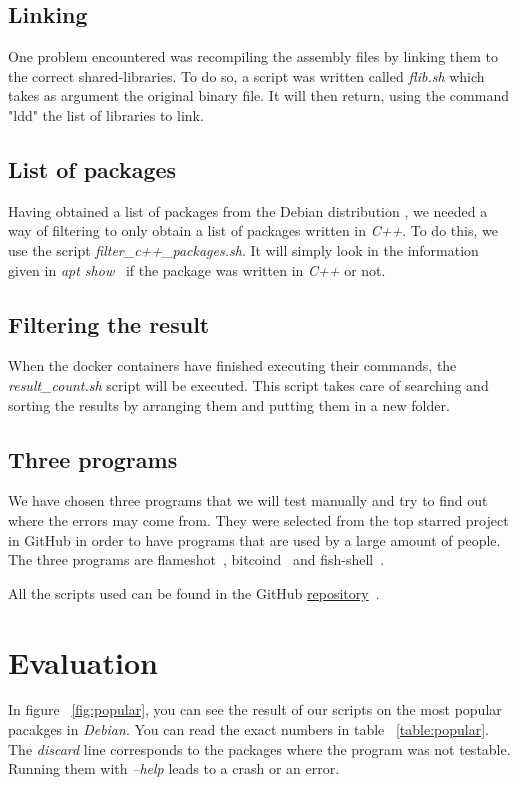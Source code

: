 \documentclass[a4paper,11pt,oneside]{report}
\begin{document}
\section{Linking}
One problem encountered was recompiling the
assembly files by linking them to the correct shared-libraries. To do so, a 
script was written called  \textit{flib.sh} which takes as argument the original binary
file. It will then return, using the command "ldd"\cite{ldd} the list of
libraries to link. 

\section{List of packages}

Having obtained a list of packages from the Debian distribution
\cite{sourcePackage}, we needed a way of filtering to only obtain
a list of packages written in \textit{C++}. To do this, we use the script
\textit{filter\_c++\_packages.sh}. It will simply look in the information given
in \textit{apt show}~\cite{apt} if the package was written in \textit{C++} or
not. 

\section{Filtering the result}
When the docker containers have finished executing their commands, the
\textit{result\_count.sh} script will be executed. This script takes care of searching
and sorting the results by arranging them and putting them in a new folder.

\section{Three programs}
We have chosen three programs that we will test manually and try to find out
where the errors may come from. They were selected from the top starred project
in GitHub in order to have programs that are used by a large amount of people.
The three programs are flameshot~\cite{flameshot}, bitcoind~\cite{bitcoind} and
fish-shell~\cite{fish}.


All the scripts used can be found in the GitHub
\href{https://github.com/ha2san/debian_docker/tree/main/scripts}{repository}~\cite{repo}.

\chapter{Evaluation}
In figure ~\ref{fig:popular}, you can see the result of our scripts on the most
popular pacakges in \textit{Debian}. You can read the exact numbers in table
~\ref{table:popular}. The \textit{discard} line corresponds to the packages
where the program was not testable. Running them with \textit{--help} leads
to a crash or an error. 
\end{document}
